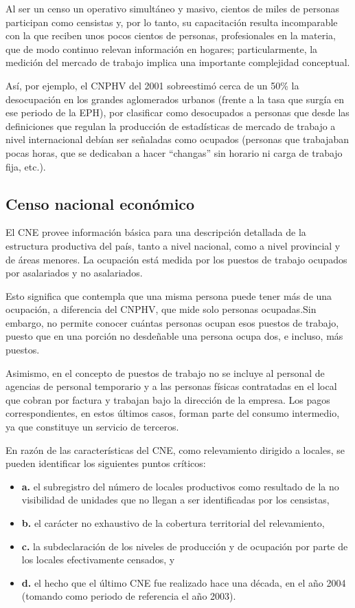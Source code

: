\documentclass[
  openany]{book}
\providecommand{\tightlist}{%
  \setlength{\itemsep}{0pt}\setlength{\parskip}{0pt}}
\begin{document}
Al ser un censo un operativo simultáneo y masivo, cientos de miles de personas participan como censistas y, por lo tanto, su capacitación resulta incomparable con la que reciben unos pocos cientos de personas, profesionales en la materia, que de modo continuo relevan información en hogares; particularmente, la medición del mercado de trabajo implica una importante complejidad conceptual.

Así, por ejemplo, el CNPHV del 2001 sobreestimó cerca de un 50\% la desocupación en los grandes aglomerados urbanos (frente a la tasa que surgía en ese periodo de la EPH), por clasificar como desocupados a personas que desde las definiciones que regulan la producción de estadísticas de mercado de trabajo a nivel internacional debían ser señaladas como ocupados (personas que trabajaban pocas horas, que se dedicaban a hacer ``changas'' sin horario ni carga de trabajo fija, etc.).

\hypertarget{censo-nacional-econuxf3mico}{%
\subsection{Censo nacional económico}\label{censo-nacional-econuxf3mico}}

El CNE provee información básica para una descripción detallada de la estructura productiva del país, tanto a nivel nacional, como a nivel provincial y de áreas menores.
La ocupación está medida por los puestos de trabajo ocupados por asalariados y no asalariados.

Esto significa que contempla que una misma persona puede tener más de una ocupación, a diferencia del CNPHV, que mide solo personas ocupadas.Sin embargo, no permite conocer cuántas personas ocupan esos puestos de trabajo, puesto que en una porción no desdeñable una persona ocupa dos, e incluso, más puestos.

Asimismo, en el concepto de puestos de trabajo no se incluye al personal de agencias de personal temporario y a las personas físicas contratadas en el local que cobran por factura y trabajan bajo la dirección de la empresa. Los pagos correspondientes, en estos últimos casos, forman parte del consumo intermedio, ya que constituye un servicio de terceros.

En razón de las características del CNE, como relevamiento dirigido a locales, se pueden identificar los siguientes puntos críticos:

\begin{itemize}
\tightlist
\item
  \textbf{a.} el subregistro del número de locales productivos como resultado de la no visibilidad de unidades que no llegan a ser identificadas por los censistas,
\item
  \textbf{b.} el carácter no exhaustivo de la cobertura territorial del relevamiento,
\item
  \textbf{c.} la subdeclaración de los niveles de producción y de ocupación por parte de los locales efectivamente censados, y
\item
  \textbf{d.} el hecho que el último CNE fue realizado hace una década, en el año 2004 (tomando como periodo de referencia el año 2003).
\end{itemize}
\end{document}

